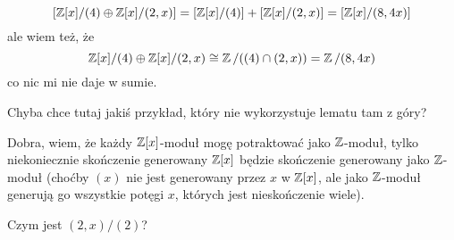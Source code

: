 $$[\Z[x]/(4)\oplus\Z[x]/(2, x)]=[\Z[x]/(4)]+[\Z[x]/(2, x)]=[\Z[x]/(8, 4x)]$$
ale wiem też, że 
$$\Z[x]/(4)\oplus\Z[x]/(2, x)\cong\Z/((4)\cap (2, x))=\Z/(8, 4x)$$
co nic mi nie daje w sumie.

Chyba chce tutaj jakiś przykład, który nie wykorzystuje lematu tam z góry?

Dobra, wiem, że każdy $\Z[x]$-moduł mogę potraktować jako $\Z$-moduł, tylko niekoniecznie skończenie generowany $\Z[x]$ będzie skończenie generowany jako $\Z$-moduł (choćby $(x)$ nie jest generowany przez $x$ w $\Z[x]$, ale jako $\Z$-moduł generują go wszystkie potęgi $x$, których jest nieskończenie wiele). 

Czym jest $(2, x)/(2)$?
